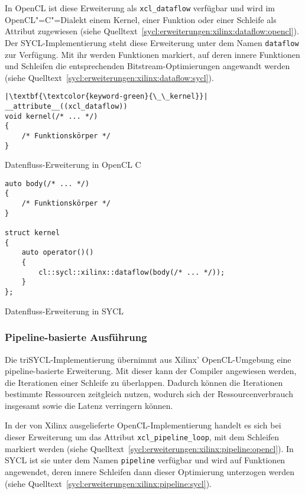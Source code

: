 In OpenCL ist diese Erweiterung als \texttt{xcl\_dataflow} verfügbar und wird
im OpenCL"=C"=Dialekt einem Kernel, einer Funktion oder einer Schleife als
Attribut zugewiesen (siehe
Quelltext~\ref{sycl:erweiterungen:xilinx:dataflow:opencl}). Der
SYCL-Implementierung steht diese Erweiterung unter dem Namen \texttt{dataflow}
zur Verfügung. Mit ihr werden Funktionen markiert, auf deren innere Funktionen
und Schleifen die entsprechenden Bitstream-Optimierungen angewandt werden (siehe
Quelltext~\ref{sycl:erweiterungen:xilinx:dataflow:sycl}).

\begin{code}
    \begin{verbatim}
|\textbf{\textcolor{keyword-green}{\_\_kernel}}| __attribute__((xcl_dataflow))
void kernel(/* ... */)
{
    /* Funktionskörper */
}
    \end{verbatim}
    \caption{Datenfluss-Erweiterung in OpenCL C}
    \label{sycl:erweiterungen:xilinx:dataflow:opencl}
\end{code}

\begin{code}
    \begin{verbatim}
auto body(/* ... */)
{
    /* Funktionskörper */
}

struct kernel
{
    auto operator()()
    {
        cl::sycl::xilinx::dataflow(body(/* ... */));
    }
};
    \end{verbatim}
    \caption{Datenfluss-Erweiterung in SYCL}
    \label{sycl:erweiterungen:xilinx:dataflow:sycl}
\end{code}

\subsubsection{Pipeline-basierte Ausführung}
\label{sycl:erweiterungen:xilinx:pipeline}

Die triSYCL-Implementierung übernimmt aus Xilinx' OpenCL-Umgebung eine
pipeline-basierte Erweiterung. Mit dieser kann der Compiler angewiesen werden,
die Iterationen einer Schleife zu überlappen. Dadurch können die Iterationen
bestimmte Ressourcen zeitgleich nutzen, wodurch sich der Ressourcenverbrauch
insgesamt sowie die Latenz verringern können.
\cite[siehe][67\psqq]{sdaccelopt2019}

In der von Xilinx ausgelieferte OpenCL-Implementierung handelt es sich bei
dieser Erweiterung um das Attribut \texttt{xcl\_pipeline\_loop}, mit dem
Schleifen markiert werden (siehe
Quelltext~\ref{sycl:erweiterungen:xilinx:pipeline:opencl}). In SYCL ist sie
unter dem Namen \texttt{pipeline} verfügbar und wird auf Funktionen angewendet,
deren innere Schleifen dann dieser Optimierung unterzogen werden (siehe
Quelltext~\ref{sycl:erweiterungen:xilinx:pipeline:sycl}).

